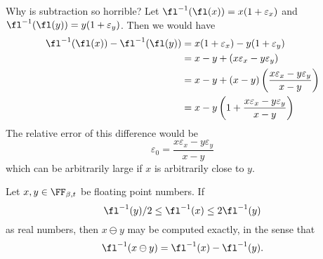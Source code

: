 Why is subtraction so horrible? Let $\fl^{-1}(\fl(x)) = x(1 + \varepsilon_{x})$
and $\fl^{-1}(\fl(y)) = y(1 + \varepsilon_{y})$. Then we would have
\begin{subequations}
  \begin{align}
    \fl^{-1}(\fl(x))-\fl^{-1}(\fl(y))
    &= x(1 + \varepsilon_{x})-y(1+\varepsilon_{y})\\
    &= x-y + (x\varepsilon_{x}-y\varepsilon_{y})\\
    &= x-y + (x-y)\left(\frac{x\varepsilon_{x}-y\varepsilon_{y}}{x-y}\right)\\
    &= x-y \left(1 + \frac{x\varepsilon_{x}-y\varepsilon_{y}}{x-y}\right)
  \end{align}
\end{subequations}
The relative error of this difference would be
\begin{equation}
  \varepsilon_{0} = \frac{x\varepsilon_{x}-y\varepsilon_{y}}{x-y}
\end{equation}
which can be arbitrarily large if $x$ is arbitrarily close to $y$.

\begin{lemma}[Sternbenz]
  Let $x,y\in\FF_{\beta,t}$ be floating point numbers.
  If
  \begin{equation}
    \fl^{-1}(y)/2\leq \fl^{-1}(x)\leq 2\fl^{-1}(y)
  \end{equation}
  as real numbers,
  then $x\ominus y$ may be computed exactly, in the sense that
  \begin{equation}
    \fl^{-1}(x\ominus y) = \fl^{-1}(x) - \fl^{-1}(y).
  \end{equation}
\end{lemma}

